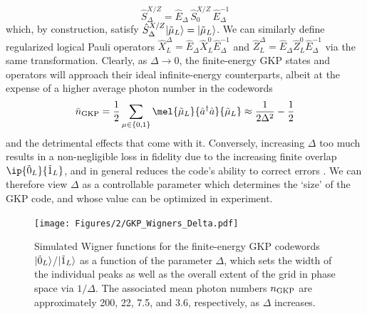 \begin{equation}
    \hat{S}_\Delta^{X/Z} = \hat{E}_\Delta\,\hat{S}_0^{X/Z}\,\hat{E}_\Delta^{-1}
\end{equation}
which, by construction, satisfy $\hat{S}_\Delta^{X/Z}\lvert\tilde{\mu}_L\rangle = \lvert\tilde{\mu}_L\rangle$. We can similarly define regularized logical Pauli operators $\hat{X}_L^\Delta = \hat{E}_\Delta \hat{X}_L^0 \hat{E}_\Delta^{-1}$ and $\hat{Z}_L^\Delta = \hat{E}_\Delta \hat{Z}_L^0 \hat{E}_\Delta^{-1}$ via the same transformation. Clearly, as $\Delta \to 0$, the finite-energy GKP states and operators will approach their ideal infinite-energy counterparts, albeit at the expense of a higher average photon number in the codewords 
\begin{equation}
    \bar{n}_{\rm GKP} = \frac{1}{2} \sum_{\mu\in \{0,1\}} \mel{\tilde{\mu}_L}{\hat{a}^\dagger\hat{a}}{\tilde{\mu}_L} \approx \frac{1}{2\Delta^2} - \frac{1}{2}
\end{equation}
and the detrimental effects that come with it. Conversely, increasing $\Delta$ too much results in a non-negligible loss in fidelity due to the increasing finite overlap $\ip{\tilde{0}_L}{\tilde{1}_L}$, and in general reduces the code's ability to correct errors \cite{royer2020gkp}. We can therefore view $\Delta$ as a controllable parameter which determines the `size' of the GKP code, and whose value can be optimized in experiment. 



\begin{figure}[h]
    \centering
    \texttt{[image: Figures/2/GKP\_Wigners\_Delta.pdf]}
    \caption[Simulated Wigner functions for the finite-energy GKP codewords $\ket{\tilde{0}_L}$/$\ket{\tilde{1}_L}$ as a function of the GKP finite-energy width parameter $\Delta$]{Simulated Wigner functions for the finite-energy GKP codewords $\ket{\tilde{0}_L}$/$\ket{\tilde{1}_L}$ as a function of the parameter $\Delta$, which sets the width of the individual peaks as well as the overall extent of the grid in phase space via $1/\Delta$. The associated mean photon numbers $n_{\rm GKP}$ are approximately 200, 22, 7.5, and 3.6, respectively, as $\Delta$ increases.}
    \label{fig:2_GKP_Wigners_Delta}
\end{figure}

